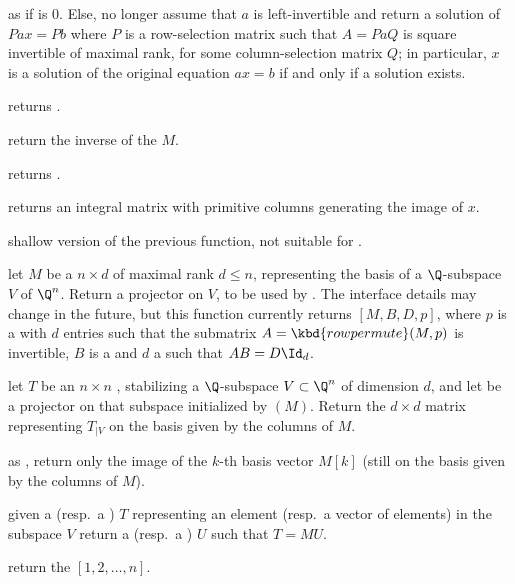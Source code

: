  as  if
 is $0$. Else, no longer assume that $a$ is left-invertible and
return a solution of $P a x = P b$ where $P$ is a row-selection matrix
such that $A = P a Q$ is square invertible of maximal rank, for some
column-selection matrix $Q$; in particular, $x$ is a solution of
the original equation $a x = b$ if and only if a solution exists.

 returns .

 return the inverse of the  $M$.

 returns .

 returns an integral matrix with primitive columns
generating the image of $x$.

 shallow version of the previous function,
not suitable for .


 let $M$ be a  $n\times d$  of
maximal rank $d \leq n$, representing the basis of a $\Q$-subspace
$V$ of $\Q^n$. Return a projector on $V$, to be used by .
The interface details may change in the future, but this function currently
returns $[M, B,D,p]$, where $p$ is a  with $d$ entries
such that the submatrix $A = \kbd{rowpermute}(M,p)$ is invertible, $B$ is a
 and $d$ a  such that $A B = D \Id_d$.

 let $T$ be an $n\times n$
, stabilizing a $\Q$-subspace $V\subset \Q^n$ of dimension $d$, and
let  be a projector on that subspace initialized by
$(M)$. Return the $d\times d$ matrix representing $T_{|V}$
on the basis given by the columns of $M$.

 as
, return only the image of the $k$-th basis vector $M[k]$
(still on the basis given by the columns of $M$).

 given a  (resp.~a )
$T$ representing an element (resp.~a vector of elements) in the subspace $V$
return a  (resp.~a ) $U$ such that $T = MU$.


 return the  $[1, 2, \dots, n]$.

